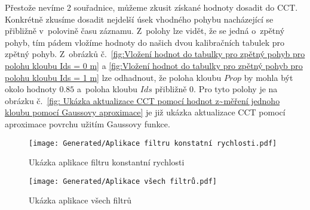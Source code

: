 \par
Přestože nevíme 2 souřadnice, můžeme zkusit získané hodnoty dosadit do CCT. Konkrétně zkusíme dosadit nejdelší úsek vhodného pohybu nacházející se přibližně v~polovině času záznamu. Z~polohy lze vidět, že se jedná o~zpětný pohyb, tím pádem vložíme hodnoty do našich dvou kalibračních tabulek pro zpětný pohyb. Z~obrázků č.~\ref{fig:Vložení hodnot do tabulky pro zpětný pohyb pro polohu kloubu Ids = 0 m} a \ref{fig:Vložení hodnot do tabulky pro zpětný pohyb pro polohu kloubu Ids = 1 m} lze odhadnout, že poloha kloubu $Prop$ by mohla být okolo hodnoty $0.85$ a~poloha kloubu $Ids$ přibližně $0$. Pro tyto polohy je na obrázku č.~\ref{fig: Ukázka aktualizace CCT pomocí hodnot z~měření jednoho kloubu pomocí Gaussovy aproximace} je již ukázka aktualizace CCT pomocí aproximace povrchu užitím Gaussovy funkce.

\begin{landscapeimagepage}
    \vspace*{\fill}
    \begin{figure}[H]
        \centering
        \texttt{[image: Generated/Aplikace filtru konstatní rychlosti.pdf]}
        \caption{Ukázka aplikace filtru konstantní rychlosti}
        \label{fig:Ukázka aplikace filtru konstantní rychlosti}
    \end{figure}
    \vspace*{\fill}
\end{landscapeimagepage}

\begin{landscapeimagepage}
    \vspace*{\fill}
    \begin{figure}[H]
        \centering
        \texttt{[image: Generated/Aplikace všech filtrů.pdf]}
        \caption{Ukázka aplikace všech filtrů}
        \label{fig:Ukázka aplikace všech filrů}
    \end{figure}
    \vspace*{\fill}
\end{landscapeimagepage}

